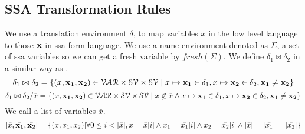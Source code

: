 \documentclass[a4paper,11pt]{article}
\begin{document}
\subsection{SSA Transformation Rules}
We use a translation environment $\delta$, to map variables $x$ in the low level language to those $\mathbf{{x}}$ in ssa-form language. We use a name environment denoted as $\Sigma$, a set of ssa variables so we can get a fresh variable by $fresh(\Sigma)$. We define $\delta_1 \bowtie \delta_2 $ in a similar way as
\cite{vekris2016refinement}.
\[ \delta_1 \bowtie \delta_2 = \{ ( x, {\mathbf{{x_1}}, \mathbf{{x_2}}} ) \in \mathcal{VAR} \times \mathcal{SV} \times \mathcal{SV} \mid x \mapsto {\mathbf{{x_1}}} \in \delta_1 , x \mapsto {\mathbf{{x_2}} } \in \delta_2, {\mathbf{{x_1}} \not= {\mathbf{{x_2}} }  }  \} \]
\[ \delta_1 \bowtie \delta_2 / \bar{x} = \{ ( x, {\mathbf{{x_1}}, \mathbf{{x_2}}} ) \in \mathcal{VAR} \times \mathcal{SV} \times \mathcal{SV} \mid x \not\in \bar{x} \land x \mapsto {\mathbf{{x_1}}} \in \delta_1 , x \mapsto {\mathbf{{x_2}} } \in \delta_2, {\mathbf{{x_1}} \not= {\mathbf{{x_2}} }   }  \} \]
We call a list of variables $\bar{x}$.
\[
 [\bar{x}, \bar{\mathbf{{x_1}}}, \bar{\mathbf{{x_2}}}] = \{ (x, x_1,x_2)  | \forall 0 \leq i < |\bar{x}|, x = \bar{x }[i] \land x_1 = \bar{x_1}[i] \land x_2 = \bar{x_2 }[i] \land |\bar{x}| = |\bar{x_1}| = |\bar{x_2}|   \}
\]
\end{document}
